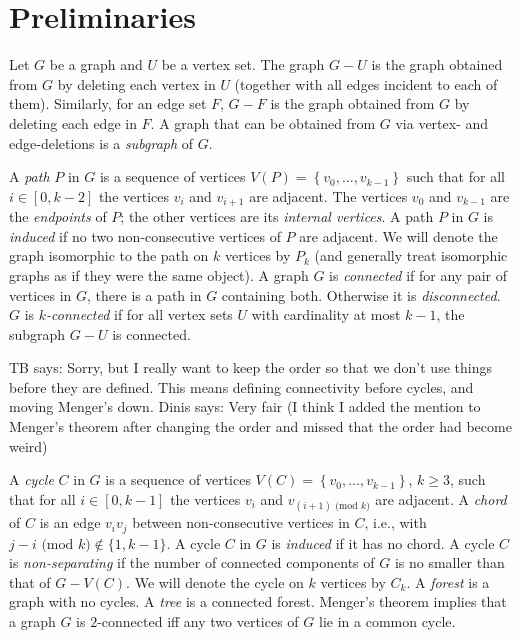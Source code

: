 \documentclass[a4paper,preprint,12pt]{elsarticle}
\newcommand{\therese}[1]{{\color{brown} TB says: #1}}
\newcommand{\dinis}[1]{{\color{blue} Dinis says: #1}}
\newcommand{\therese}[1]{}
\newcommand{\dinis}[1]{}
\newcommand{\curlybrackets}[1]{\left\{#1\right\}}
\renewcommand{\mod}[1]{\text{ (mod }#1\text{)}}
\begin{document}
\section{Preliminaries}
\label{sec: prelims}
Let $G$ be a graph and $U$ be a vertex set.
The graph $G-U$ is the graph obtained from $G$ by deleting each vertex in $U$ (together with all edges incident to each of them).
Similarly, for an edge set $F$, $G-F$ is the graph obtained from $G$ by deleting each edge in $F$.
A graph that can be obtained from $G$ via vertex- and edge-deletions is a \emph{subgraph} of $G$.

A \emph{path} $P$ in $G$ is a sequence of vertices $V(P)=\curlybrackets{v_0,\dots,v_{k-1}}$ such that for all $i\in[0,k-2]$ the vertices $v_i$ and $v_{i+1}$ are adjacent.
The vertices $v_0$ and $v_{k-1}$ are the \emph{endpoints} of $P$; the other vertices are its \emph{internal vertices}.
A path $P$ in $G$ is \emph{induced} if no two non-consecutive vertices of $P$ are adjacent.
We will denote the graph isomorphic to the path on $k$ vertices by $P_k$ (and generally treat isomorphic graphs as if they were the same object).
A graph $G$ is \emph{connected} if for any pair of vertices in $G$, there is a path in $G$ containing both.
Otherwise it is \emph{disconnected}.
$G$ is \emph{$k$-connected} if for all vertex sets $U$ with cardinality at most $k-1$, the subgraph $G-U$ is connected.

\therese{Sorry, but I really want to keep the order so that we don't use things before they are defined.   This means defining connectivity before cycles, and moving Menger's down.}
\dinis{Very fair (I think I added the mention to Menger's theorem after changing the order and missed that the order had become weird)}

A \emph{cycle} $C$ in $G$ is a sequence of vertices $V(C)=\curlybrackets{v_0,\dots,v_{k-1}}$, $k\geq 3$, such that for all $i\in[0,k-1]$ the vertices $v_i$ and $v_{(i+1)\mod k}$ are adjacent.
A \emph{chord} of $C$ is an edge $v_iv_j$ between non-consecutive vertices in $C$, i.e., with $j-i\mod k\notin\{1,k-1\}$.
A cycle $C$ in $G$ is \emph{induced} if it has no chord.
A cycle $C$ is \emph{non-separating} if the number of connected components of $G$ is no smaller than that of $G-V(C)$.
We will denote the cycle on $k$ vertices by $C_k$.
A \emph{forest} is a graph with no cycles.
A \emph{tree} is a connected forest.
Menger's theorem implies that a graph $G$ is $2$-connected iff any two vertices of $G$ lie in a common cycle.

 
\end{document}
